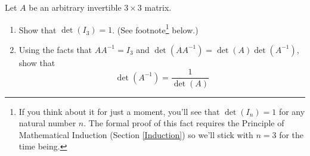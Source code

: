 \documentclass{ximera}
\begin{document}
\begin{problem}
Let $A$ be an arbitrary invertible $3 \times 3$ matrix.  

\begin{enumerate}

\item Show that $\det(I_3) = 1$. (See footnote\footnote{If you think about it for just a moment, you'll see that $\det(I_{n}) = 1$ for any natural number $n$.  The formal proof of this fact requires the Principle of Mathematical Induction (Section \ref{Induction}) so we'll stick with $n = 3$ for the time being.} below.)

\item Using the facts that $AA^{-1} = I_{3}$ and $\det(AA^{-1}) = \det(A)\det(A^{-1})$, show that \[\det(A^{-1}) = \frac{1}{\det(A)}\]

\end{enumerate}
\end{problem}
\end{document}
